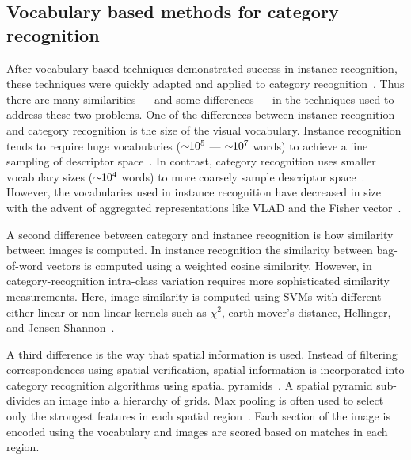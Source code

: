     \subsection{Vocabulary based methods for category recognition}
        After vocabulary based techniques demonstrated success in
          instance recognition, these techniques were quickly adapted and
          applied to category recognition~\cite{csurka_visual_2004}.
        Thus there are many similarities --- and some differences ---
          in the techniques used to address these two problems.
        One of the differences between instance recognition and
          category recognition is the size of the visual vocabulary.
        Instance recognition tends to require huge vocabularies
          ($\sim\mkern-6mu 10^{5}$ --- $\sim\mkern-6mu 10^{7}$ words) to achieve a
          fine sampling of descriptor space~\cite{nister_scalable_2006,
          philbin_object_2007}.
        In contrast, category recognition uses smaller vocabulary sizes
        ($\sim\mkern-6mu 10^{4}$ words) to more coarsely sample descriptor
          space~\cite{zhang_local_2006}.
        However, the vocabularies used in instance recognition have
          decreased in size with the advent of aggregated representations
          like VLAD and the Fisher vector~\cite{arandjelovic_all_2013,
          sanchez_compressed_2013}.

        A second difference between category and instance recognition
          is how similarity between images is computed.
        In instance recognition the similarity between bag-of-word
          vectors is computed using a weighted cosine similarity.
        However, in category-recognition intra-class variation requires
          more sophisticated similarity measurements.
        Here, image similarity is computed using SVMs with different
          either linear or non-linear kernels such as $\chi^2$, earth
          mover's distance, Hellinger, and
          Jensen-Shannon~\cite{zhang_local_2006, varma_learning_2007,
          vedaldi_efficient_2012}.

        A third difference is the way that spatial information is used.
        Instead of filtering correspondences using spatial
          verification, spatial information is incorporated into category
          recognition algorithms using spatial
          pyramids~\cite{grauman_pyramid_2005, lazebnik_beyond_2006}.
        A spatial pyramid sub-divides an image into a hierarchy of
          grids.
        Max pooling is often used to select only the strongest features
          in each spatial region~\cite{boureau_theoretical_2010,
          boureau_learning_2010}.
        Each section of the image is encoded using the vocabulary and
          images are scored based on matches in each region.

